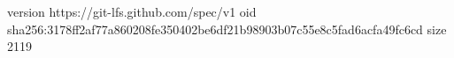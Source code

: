 version https://git-lfs.github.com/spec/v1
oid sha256:3178ff2af77a860208fe350402be6df21b98903b07c55e8c5fad6acfa49fc6cd
size 2119
